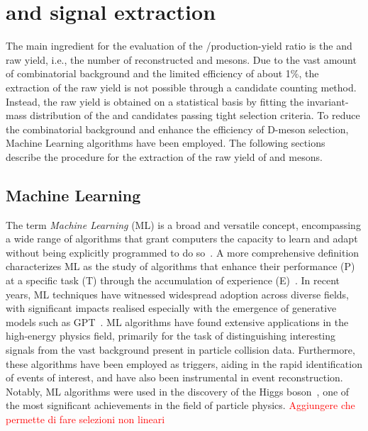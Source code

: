 \chapter{\texorpdfstring{\ds and \dpl signal extraction}{Ds+ and D+ signal extraction}}

The main ingredient for the evaluation of the \ds/\dpl production-yield ratio is the \ds and \dpl raw yield, i.e., the number of reconstructed \ds and \dpl mesons. Due to the vast amount of combinatorial background and the limited efficiency of about 1\%, the extraction of the raw yield is not possible through a candidate counting method. Instead, the raw yield is obtained on a statistical basis by fitting the invariant-mass distribution of the \ds and \dpl candidates passing tight selection criteria. To reduce the combinatorial background and enhance the efficiency of D-meson selection, Machine Learning algorithms have been employed. The following sections describe the procedure for the extraction of the raw yield of \ds and \dpl mesons. 

\section{Machine Learning}
The term \emph{Machine Learning} (ML) is a broad and versatile concept, encompassing a wide range of algorithms that grant computers the capacity to learn and adapt without being explicitly programmed to do so~\cite{5392560}. A more comprehensive definition characterizes ML as the study of algorithms that enhance their performance (P) at a specific task (T) through the accumulation of experience (E)~\cite{mitchell1997machine}. In recent years, ML techniques have witnessed widespread adoption across diverse fields, with significant impacts realised especially with the emergence of generative models such as GPT~\cite{openai2023gpt4}.
ML algorithms have found extensive applications in the high-energy physics field, primarily for the task of distinguishing interesting signals from the vast background present in particle collision data. Furthermore, these algorithms have been employed as triggers, aiding in the rapid identification of events of interest, and have also been instrumental in event reconstruction. Notably, ML algorithms were used in the discovery of the Higgs boson~\cite{CMS:2012qbp}, one of the most significant achievements in the field of particle physics. \textcolor{red}{Aggiungere che permette di fare selezioni non lineari}

